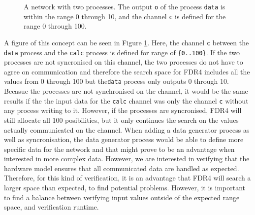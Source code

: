 \begin{figure}
    \centering
    \caption{A \cspm{} network with two processes. The output \texttt{o} of the process \texttt{data} is within the range 0 through 10, and the channel \texttt{c} is defined for the range 0 through 100.}
    \label{fig:csp_data_generator_process}
\end{figure}
A figure of this concept can be seen in Figure \ref{fig:csp_data_generator_process}. Here, the channel \texttt{c} between the \texttt{data} process and the \texttt{calc} process is defined for range of \texttt{\{0..100\}}. If the two processes are not syncronised on this channel, the two processes do not have to agree on communication and therefore the search space for FDR4 includes all the values from 0 through 100 but the\texttt{data} process only outputs 0 through 10. Becasue the processes are not synchronised on the channel, it would be the same results if the the input data for the \texttt{calc} channel was only the channel \texttt{c} without any process writing to it.
However, if the processes are syncronised, FDR4 will still allocate all 100 posibilities, but it only continues the search on the values actually communicated on the channel.
When adding a data generator process as well as syncronisation, the data generator process would be able to define more specific data for the network and that might prove to be an advantage when interested in more complex data. However, we are interested in verifying that the hardware model ensures that all communicated data are handled as expected. Therefore, for this kind of verification, it is an advantage that FDR4 will search a larger space than expected, to find potential problems. However, it is important to find a balance between verifying input values outside of the expected range space, and verification runtime.

